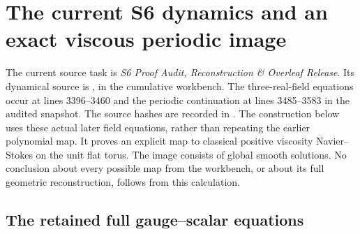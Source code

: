 \section{The current S6 dynamics and an exact viscous periodic image}
\label{sec:s6-dynamics}

The current source task is \emph{S6 Proof Audit, Reconstruction \& Overleaf
Release}. Its dynamical source is
,
in the cumulative  workbench.
The three-real-field equations occur at lines 3396--3460 and the periodic
continuation at lines 3485--3583 in the audited snapshot. The source hashes
are recorded in . The construction
below uses these actual later field equations, rather than repeating the
earlier polynomial map. It proves an explicit map to classical positive
viscosity Navier--Stokes on the unit flat torus. The image consists of global
smooth solutions. No conclusion about every possible map from the workbench,
or about its full geometric reconstruction, follows from this calculation.

\subsection{The retained full gauge--scalar equations}

